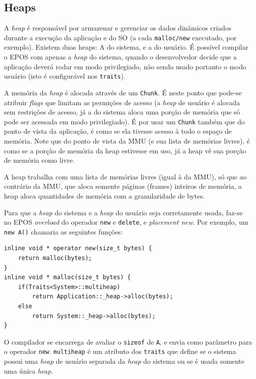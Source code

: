 


\subsection{Heaps}

A \emph{heap} é responsável por armazenar e gerenciar os dados dinâmicos criados durante a execução da aplicação e do SO (a cada \verb+malloc/new+ executado, por exemplo). Existem duas heaps: A do sistema, e a do usuário. É possível compilar o EPOS com apenas a \emph{heap} do sistema, quando o desenvolvedor decide que a aplicação deverá rodar em modo privilegiado, não sendo usado portanto o modo usuário (isto é configurável nos \verb+traits+).

A memória da \emph{heap} é alocada através de um \verb+Chunk+. É neste ponto que pode-se atribuir \emph{flags} que limitam as permições de acesso (a \emph{heap} de usuário é alocada sem restrições de acesso, já a do sistema aloca uma porção de memória que só pode ser acessada em modo privilegiado). É por usar um \verb+Chunk+ também que do ponto de vista da aplicação, é como se ela tivesse acesso à todo o espaço de memória. Note que do ponto de vista da MMU (e sua lista de memórias livres), é como se a porção de memória da heap estivesse em uso, já a heap vê sua porção de memória como livre.

A heap trabalha com uma lista de memórias livres (igual à da MMU), só que ao contrário da MMU, que aloca somente páginas (frames) inteiros de memória, a heap aloca quantidades de memória com a granularidade de bytes.

Para que a \emph{heap} do sistema e a \emph{heap} do usuário seja corretamente usada, faz-se no EPOS \emph{overload} do operador \verb+new+ e \verb+delete+, e \emph{placement new}. Por exemplo, um \verb+new A()+ chamaria as seguintes funções:

\begin{lstlisting}
inline void * operator new(size_t bytes) {
    return malloc(bytes);
}
inline void * malloc(size_t bytes) {
    if(Traits<System>::multiheap)
        return Application::_heap->alloc(bytes);
    else
        return System::_heap->alloc(bytes);
}
\end{lstlisting}

O compilador se encarrega de avaliar o \verb+sizeof+ de \verb+A+, e envia como parâmetro para o operador \verb+new+. \verb+multiheap+ é um atributo dos \verb+traits+ que define se o sistema possui uma \emph{heap} de usuário separada da \emph{heap} do sistema ou se é usada somente uma única \emph{heap}.

